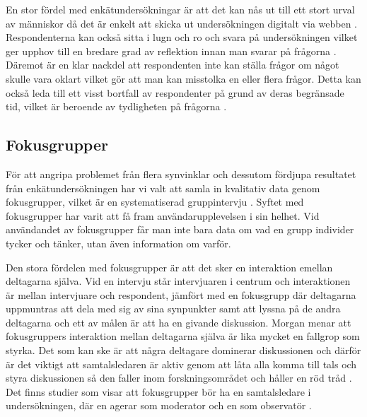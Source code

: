 En stor fördel med enkätundersökningar är att det kan nås ut till ett stort urval av människor då det är enkelt att skicka ut undersökningen digitalt via webben \cite{Boynton2004SelectingQuestionnaire}. Respondenterna kan också sitta i lugn och ro och svara på undersökningen vilket ger upphov till en bredare grad av reflektion innan man svarar på frågorna \cite{Boynton2004SelectingQuestionnaire}. Däremot är en klar nackdel att respondenten inte kan ställa frågor om något skulle vara oklart vilket gör att man kan misstolka en eller flera frågor. Detta kan också leda till ett visst bortfall av respondenter på grund av deras begränsade tid, vilket är beroende av tydligheten på frågorna \cite{Boynton2004SelectingQuestionnaire}. 


\subsection{Fokusgrupper}
För att angripa problemet från flera synvinklar och dessutom fördjupa resultatet från enkätundersökningen har vi valt att samla in kvalitativ data genom fokusgrupper, vilket är en systematiserad gruppintervju \cite{FokusgruppGruppintervju}. Syftet med fokusgrupper har varit att få fram användarupplevelsen i sin helhet. Vid användandet av fokusgrupper får man inte bara data om vad en grupp individer tycker och tänker, utan även information om varför. 
\newline

Den stora fördelen med fokusgrupper är att det sker en interaktion emellan deltagarna själva. Vid en intervju står intervjuaren i centrum och interaktionen är mellan intervjuare och respondent, jämfört med en fokusgrupp där deltagarna uppmuntras att dela med sig av sina synpunkter samt att lyssna på de andra deltagarna och ett av målen är att ha en givande diskussion. Morgan menar att fokusgruppers interaktion mellan deltagarna själva är lika mycket en fallgrop som styrka\cite{MorganFocusGroups}. Det som kan ske är att några deltagare dominerar diskussionen och därför är det viktigt att samtalsledaren är aktiv genom att låta alla komma till tals och styra diskussionen så den faller inom forskningsområdet och håller en röd tråd \cite{TuckmanModel}. Det finns studier som visar att fokusgrupper bör ha en samtalsledare i undersökningen, där en agerar som moderator och en som observatör \cite{Denscombe2010TheProjects}. 
\newline

